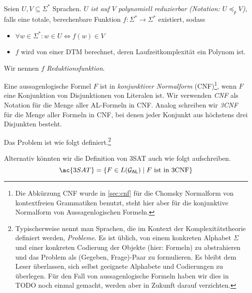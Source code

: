 \begin{Def}\label{def:PolyReduktion}\ \\
  Seien $U, V \subseteq \Sigma^*$ Sprachen.
  \emph{$U$ ist auf $V$ polynomiell reduzierbar (Notation: $U \preceq_p V$)}, falls eine totale, berechenbare Funktion
  $f:\Sigma^* \to \Sigma^*$ existiert, sodass
  \begin{itemize}
   \item $\forall w \in \Sigma^*:w \in U \iff f(w) \in V$
   \item $f$ wird von einer \ac{DTM} berechnet, deren Laufzeitkomplexität ein Polynom ist.
  \end{itemize}
  Wir nennen $f$ \emph{Reduktionsfunktion}.
\end{Def}

Eine aussagenlogische Formel $F$ ist in \emph{konjunktiver Normalform} (CNF)\footnote{%
Die Abkürzung \ac{CNF} wurde in \autoref{sec:cnf} für die Chomsky Normalform von kontextfreien Grammatiken benutzt,
steht hier aber für die konjunktive Normalform von Aussagenlogischen Formeln.
}, wenn $F$ eine Konjunktion von Disjunktionen von Literalen ist.
Wir verwenden \emph{CNF} als Notation für die Menge aller AL-Formeln in CNF.
Analog schreiben wir \emph{3CNF} für die Menge aller Formeln in CNF, bei denen jeder Konjunkt aus höchstens drei Disjunkten besteht.



\begin{Def}[name={[3SAT]}]
Das Problem  ist wie folgt definiert.\footnote{
Typischerweise nennt man Sprachen, die im Kontext der Komplexitätstheorie definiert werden, \emph{Probleme}.
Es ist üblich, von einem konkreten Alphabet $\Sigma$ und einer konkreten Codierung der Objekte (hier: Formeln) zu abstrahieren und das Problem als (Gegeben, Frage)-Paar zu formulieren.
Es bleibt dem Leser überlassen, sich selbst geeignete Alphabete und Codierungen zu überlegen.
Für den Fall von aussagenlogische Formeln haben wir dies in {\color{red} TODO} noch einmal gemacht, werden aber in Zukunft darauf verzichten.}
\begin{center}
\end{center}
	
\end{Def}
Alternativ könnten wir die Definition von \ac{3SAT} auch wie folgt aufschreiben.
$$\ac{3SAT} = \{F\in L(\mathcal{G}_\mathsf{AL})\mid F \text{ ist in 3CNF}\}$$

